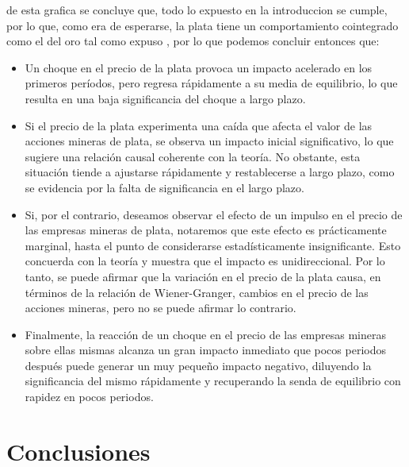 \documentclass[11pt]{article}
\begin{document}
\begin{flushleft}
  de esta grafica se concluye que, todo lo expuesto en la introduccion se cumple, por lo que, como era de esperarse, la plata tiene un comportamiento cointegrado como el del oro tal como expuso \citep{Gilmore_McManus_Sharma_Tezel_2009}, por lo que podemos concluir entonces que:
    \begin{itemize}
        \item Un choque en el precio de la plata provoca un impacto acelerado en los primeros períodos, pero regresa rápidamente a su media de equilibrio, lo que resulta en una baja significancia del choque a largo plazo.
        \item Si el precio de la plata experimenta una caída que afecta el valor de las acciones mineras de plata, se observa un impacto inicial significativo, lo que sugiere una relación causal coherente con la teoría. No obstante, esta situación tiende a ajustarse rápidamente y restablecerse a largo plazo, como se evidencia por la falta de significancia en el largo plazo.
        \item Si, por el contrario, deseamos observar el efecto de un impulso en el precio de las empresas mineras de plata, notaremos que este efecto es prácticamente marginal, hasta el punto de considerarse estadísticamente insignificante. Esto concuerda con la teoría y muestra que el impacto es unidireccional. Por lo tanto, se puede afirmar que la variación en el precio de la plata causa, en términos de la relación de Wiener-Granger, cambios en el precio de las acciones mineras, pero no se puede afirmar lo contrario.
        \item Finalmente, la reacción de un choque en el precio de las empresas mineras sobre ellas mismas alcanza un gran impacto inmediato que pocos periodos después puede generar un muy pequeño impacto negativo, diluyendo la significancia del mismo rápidamente y recuperando la senda de equilibrio con rapidez en pocos periodos.
    \end{itemize}
\end{flushleft}

\section{Conclusiones}
\end{document}

